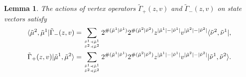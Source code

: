 \documentclass[11pt,reqno]{amsart}
\numberwithin{equation}{section}
\newtheorem{lemma}[theorem]{Lemma}
\begin{document}
	
	\begin{lemma}\label{Gamma-state}
		The actions of vertex operators $\tilde{\Gamma}_+(z,v)$  and $\tilde{\Gamma}_-(z,v)$ on state vectors satisfy
		\begin{align}
			\langle \tilde{\mu}^2,\tilde{\mu}^1|\tilde{\Gamma}_-(z,v) &=
			\sum_{{\tilde{\nu}^1 \prec \tilde{\mu}^1}	\atop{\tilde{\nu}^2 \prec \tilde{\mu}^2}}
			2^{\#(\tilde{\mu}^1|\tilde{\nu}^1) }2^{\#(\tilde{\mu}^2|\tilde{\nu}^2) }
			z^{|\tilde{\mu}^1| - |\tilde{\nu}^1|}    v^{|\tilde{\mu}^2| - |\tilde{\nu}^2|}     \langle \tilde{\nu}^2,\tilde{\nu}^1|,\\
			\tilde{\Gamma}_+(z,v)|\tilde{\mu}^1,\tilde{\mu}^2 \rangle &= 	
			\sum_{{\tilde{\nu}^1 \prec \tilde{\mu}^1}	\atop{\tilde{\nu}^2 \prec \tilde{\mu}^2}}
			2^{\#(\tilde{\mu}^1|\tilde{\nu}^1) }2^{\#(\tilde{\mu}^2|\tilde{\nu}^2) }
			z^{|\tilde{\mu}^1| - |\tilde{\nu}^1|}    v^{|\tilde{\mu}^2| - |\tilde{\nu}^2|}         |\tilde{\nu}^1,\tilde{\nu}^2 \rangle.
		\end{align}
	\end{lemma}
\end{document}
